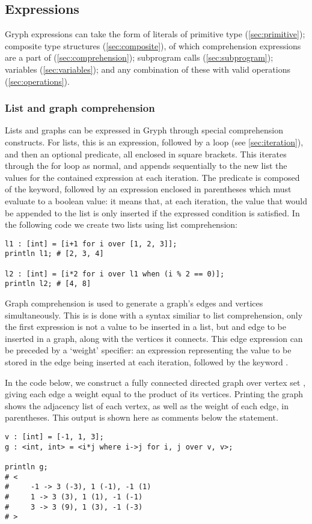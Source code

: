 \subsection{Expressions}
\label{sec:expressions}
Gryph expressions can take the form of literals of primitive type (\autoref{sec:primitive}); composite type structures (\autoref{sec:composite}), of which comprehension expressions are a part of (\autoref{sec:comprehension}); subprogram calls (\autoref{sec:subprogram}); variables (\autoref{sec:variables}); and any combination of these with valid operations (\autoref{sec:operations}).

\subsubsection{List and graph comprehension}
\label{sec:comprehension}
Lists and graphs can be expressed in Gryph through special comprehension constructs. For lists, this is an expression, followed by a  loop (see \autoref{sec:iteration}), and then an optional predicate, all enclosed in square brackets. This iterates through the for loop as normal, and appends sequentially to the new list the values for the contained expression at each iteration. The predicate is composed of the  keyword, followed by an expression enclosed in parentheses which must evaluate to a boolean value: it means that, at each iteration, the value that would be appended to the list is only inserted if the expressed condition is satisfied.
In the following code we create two lists using list comprehension:
\begin{lstlisting}[language=Gryph]
l1 : [int] = [i+1 for i over [1, 2, 3]];
println l1; # [2, 3, 4]

l2 : [int] = [i*2 for i over l1 when (i % 2 == 0)];
println l2; # [4, 8]
\end{lstlisting}

Graph comprehension is used to generate a graph's edges and vertices simultaneously. This is is done with a syntax similiar to list comprehension, only the first expression is not a value to be inserted in a list, but and edge to be inserted in a graph, along with the vertices it connects. This edge expression can be preceded by a `weight' specifier: an expression representing the value to be stored in the edge being inserted at each iteration, followed by the keyword .

In the code below, we construct a fully connected directed graph over vertex set , giving each edge a weight equal to the product of its vertices. Printing the graph shows the adjacency list of each vertex, as well as the weight of each edge, in parentheses. This output is shown here as comments below the  statement.
\begin{lstlisting}[language=Gryph]
v : [int] = [-1, 1, 3];
g : <int, int> = <i*j where i->j for i, j over v, v>;

println g;
# <
#     -1 -> 3 (-3), 1 (-1), -1 (1)
#     1 -> 3 (3), 1 (1), -1 (-1)
#     3 -> 3 (9), 1 (3), -1 (-3)
# >
\end{lstlisting}

